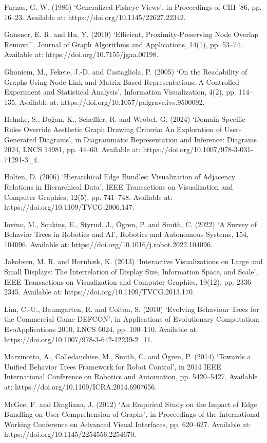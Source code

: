 \documentclass[11pt,a4paper,oneside,extrafontsizes]{memoir}
\begin{document}
Furnas, G. W. (1986) ‘Generalized Fisheye Views’, in Proceedings of CHI ’86, pp. 16–23. Available at: https://doi.org/10.1145/22627.22342.

Gansner, E. R. and Hu, Y. (2010) ‘Efficient, Proximity-Preserving Node Overlap Removal’, Journal of Graph Algorithms and Applications, 14(1), pp. 53–74. Available at: https://doi.org/10.7155/jgaa.00198.

Ghoniem, M., Fekete, J.-D. and Castagliola, P. (2005) ‘On the Readability of Graphs Using Node-Link and Matrix-Based Representations: A Controlled Experiment and Statistical Analysis’, Information Visualization, 4(2), pp. 114–135. Available at: https://doi.org/10.1057/palgrave.ivs.9500092.

Helmke, S., Doğan, K., Scheffler, R. and Wrobel, G. (2024) ‘Domain-Specific Rules Override Aesthetic Graph Drawing Criteria: An Exploration of User-Generated Diagrams’, in Diagrammatic Representation and Inference: Diagrams 2024, LNCS 14981, pp. 44–60. Available at: https://doi.org/10.1007/978-3-031-71291-3\_4.

Holten, D. (2006) ‘Hierarchical Edge Bundles: Visualization of Adjacency Relations in Hierarchical Data’, IEEE Transactions on Visualization and Computer Graphics, 12(5), pp. 741–748. Available at: https://doi.org/10.1109/TVCG.2006.147.

Iovino, M., Scukins, E., Styrud, J., Ögren, P. and Smith, C. (2022) ‘A Survey of Behavior Trees in Robotics and AI’, Robotics and Autonomous Systems, 154, 104096. Available at: https://doi.org/10.1016/j.robot.2022.104096.

Jakobsen, M. R. and Hornbæk, K. (2013) ‘Interactive Visualizations on Large and Small Displays: The Interrelation of Display Size, Information Space, and Scale’, IEEE Transactions on Visualization and Computer Graphics, 19(12), pp. 2336–2345. Available at: https://doi.org/10.1109/TVCG.2013.170.

Lim, C.-U., Baumgarten, R. and Colton, S. (2010) ‘Evolving Behaviour Trees for the Commercial Game DEFCON’, in Applications of Evolutionary Computation: EvoApplications 2010, LNCS 6024, pp. 100–110. Available at: https://doi.org/10.1007/978-3-642-12239-2\_11.

Marzinotto, A., Colledanchise, M., Smith, C. and Ögren, P. (2014) ‘Towards a Unified Behavior Trees Framework for Robot Control’, in 2014 IEEE International Conference on Robotics and Automation, pp. 5420–5427. Available at: https://doi.org/10.1109/ICRA.2014.6907656.

McGee, F. and Dingliana, J. (2012) ‘An Empirical Study on the Impact of Edge Bundling on User Comprehension of Graphs’, in Proceedings of the International Working Conference on Advanced Visual Interfaces, pp. 620–627. Available at: https://doi.org/10.1145/2254556.2254670.
\end{document}
